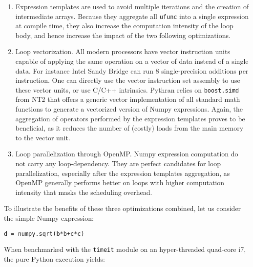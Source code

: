 \documentclass[10pt, onecolumn, preprint]{sigplanconf}
\begin{document}
\begin{enumerate}

    \item Expression templates\cite{expression_templates} are used to avoid
        multiple iterations and the creation of intermediate arrays. Because
        they aggregate all \texttt{ufunc} into a single expression at compile
        time, they also increase the computation intensity of the loop body,
        and hence increase the impact of the two following optimizations.

    \item Loop vectorization. All modern processors have vector instruction
        units capable of applying the same operation on a vector of data
        instead of a single data. For instance Intel Sandy Bridge can run 8
        single-precision additions per instruction. One can directly use the
        vector instruction set assembly to use these vector units, or use C/C++
        intrinsics. Pythran relies on \texttt{boost.simd} from NT2 that offers
        a generic vector implementation of all standard math functions to
        generate a vectorized version of Numpy expressions. Again, the
        aggregation of operators performed by the expression templates proves
        to be beneficial, as it reduces the number of (costly) loads from the
        main memory to the vector unit.

    \item Loop parallelization through OpenMP\cite{openmp3.1}. Numpy expression
        computation do not carry any loop-dependency. They are perfect
        candidates for loop parallelization, especially after the expression
        templates aggregation, as OpenMP generally performs better on loops
        with higher computation intensity that masks the scheduling overhead.

\end{enumerate}

To illustrate the benefits of these three optimizations combined, let us
consider the simple Numpy expression:

\begin{lstlisting}
d = numpy.sqrt(b*b+c*c)
\end{lstlisting}

When benchmarked with the \texttt{timeit} module on an hyper-threaded quad-core 
i7, the pure Python execution yields: %
\end{document}
